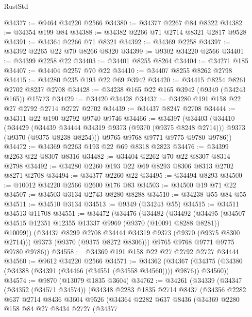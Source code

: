 \begin{lexlean}{RustStd}
\begin{coremodule}
@34377 := @9464 @34220 @2566
@34380 := @34377 @2267 @84 @8322
@34382 := @34354 @199 @84
@34388 := @34382 @2266 @71 @2714 @8321 @2817 @9528
@34391 := @34364 @2266 @71 @8321
@34392 := @34369 @2258
@34397 := @34392 @2265 @22 @70 @8266 @8320
@34399 := @9302 @34220 @2566
@34401 := @34399 @2258 @22
@34403 := @34401 @8255 @8264
@34404 := @34271 @185
@34407 := @34404 @2257 @70 @22
@34410 := @34407 @8255 @8262 @2798
@34415 := @34280 @235 @193 @22 @69 @3942
@34420 := @34415 @8254 @8261 @2702 @8237 @2708
@34428 := @34238 @165 @22 @165 @3942 (@9349 (@34243 @165)) @15773
@34429 := @34420 @34428
@34437 := @34280 @191 @158 @22 @27 @2792 @2714 @2727 @2702
@34439 := @34437 @8247 @2708
@34444 := @34311 @22 @190 @2792 @9740 @9746
@34466 := @34397
    (@34403
      (@34410
        (@34429
          (@34439 @34444 @34319 @9373 (@9370 (@9375 @8248 @2714)))
          @9373
          (@9370 (@9375 @8238 @8254)))
        @9765
        @9768
        @9771
        @9775
        @9780
        @9786))
@34472 := @34369 @2263 @193 @22 @69 @8318 @2823
@34476 := @34399 @2263 @22 @8307 @8316
@34482 := @34404 @2262 @70 @22 @8307 @8314 @2798
@34492 := @34280 @2260 @193 @22 @69 @8293 @8306 @8313 @2702 @8271 @2708
@34494 := @34377 @2260 @22
@34495 := @34494 @8293
@34500 := @10012 @34220 @2566 @2600 @176 @83
@34503 := @34500 @19 @71 @22
@34507 := @34503 @3134 @2743 @8280 @8288
@34510 := @34238 @55 @84 @55
@34511 := @34510 @3134
@34513 := @9349 (@34243 @55)
@34515 := @34511 @34513 @11708
@34551 := @34472
    (@34476
      (@34482
        (@34492
          (@34495 (@34507 @34515 @12351 @12355 @13337 @9969 (@9370 (@10091 @8288 @8281)) @10099))
          (@34437 @8299 @2708 @34444 @34319 @9373 (@9370 (@9375 @8300 @2714)))
          @9373
          (@9370 (@9375 @8272 @8306)))
        @9765
        @9768
        @9771
        @9775
        @9780
        @9786))
@34558 := @34369 @191 @158 @22 @27 @2792 @2727 @34444
@34560 := @9612 @34220 @2566
@34571 := @34362
    (@34367 (@34375 (@34380 (@34388 (@34391 (@34466 (@34551 (@34558 @34560)))) @9876)) @34560))
@34574 := @9870 (@13079 @1835 @3604)
@34762 := @34261
    (@34339
      (@34347
        (@34352 (@34571 @34574))
        (@34348
          @2283
          @1835
          @2714
          @8437
          (@34356
            @2282
            @637
            @2714
            @8436
            @3604
            @9526
            (@34364
              @2282
              @637
              @8436
              (@34369
                @2280
                @158
                @84
                @27
                @8434
                @2727
                (@34377

\end{coremodule}
\end{lexlean}
